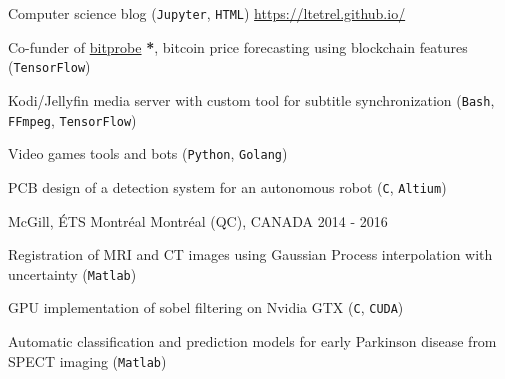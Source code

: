 


\begin{cventries}


\cventry
{} %
{} %
{} %
{} %
{ %
\vspace{-5mm}
\begin{cvitems}
\item {Computer science blog (\texttt{Jupyter}, \texttt{HTML}) \url{https://ltetrel.github.io/}}
\item {Co-funder of \href{https://bitprobe.io/}{bitprobe} \textbf{*}, bitcoin price forecasting using blockchain features (\texttt{TensorFlow})}
\item {Kodi/Jellyfin media server with custom tool for subtitle synchronization (\texttt{Bash}, \texttt{FFmpeg}, \texttt{TensorFlow})}
\item {Video games tools and bots (\texttt{Python}, \texttt{Golang})}
\item{PCB design of a detection system for an autonomous robot (\texttt{C}, \texttt{Altium})}
\end{cvitems}
}


\cventry
{} %
{McGill, ÉTS Montréal} %
{\hspace{-5mm}Montréal (QC), CANADA} %
{2014 - 2016} %
{ %
\vspace{-5mm}
\begin{cvitems}
\item {Registration of MRI and CT images using Gaussian Process interpolation with uncertainty (\texttt{Matlab})}
\item {GPU implementation of sobel filtering on Nvidia GTX (\texttt{C}, \texttt{CUDA})}
\item {Automatic classification and prediction models for early Parkinson disease from SPECT imaging (\texttt{Matlab})}
\end{cvitems}
}


\end{cventries}
